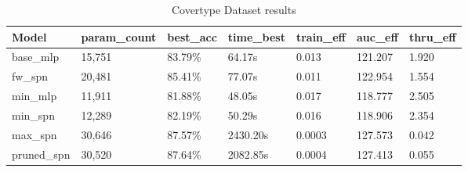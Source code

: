 \begin{table}[h!]
    \centering
    \caption{Covertype Dataset results}
    \begin{tabular}{|l|l|l|l|l|l|l|}
    \hline
    \textbf{Model} & \textbf{param\_count} & \textbf{best\_acc} & \textbf{time\_best} & \textbf{train\_eff} & \textbf{auc\_eff} & \textbf{thru\_eff} \\
    \hline
    base\_mlp & 15,751 & 83.79\% & 64.17s & 0.013 & 121.207 & 1.920 \\
    fw\_spn & 20,481 & 85.41\% & 77.07s & 0.011 & 122.954 & 1.554 \\
    min\_mlp & 11,911 & \cellcolor{red!25}81.88\% & \cellcolor{green!25}48.05s & \cellcolor{green!25}0.017 & \cellcolor{red!25}118.777 & \cellcolor{green!25}2.505 \\
    min\_spn & 12,289 & 82.19\% & 50.29s & 0.016 & 118.906 & 2.354 \\
    max\_spn & 30,646 & 87.57\% & \cellcolor{red!25}2430.20s & \cellcolor{red!25}0.0003 & \cellcolor{green!25}127.573 & \cellcolor{red!25}0.042 \\
    pruned\_spn & 30,520 & \cellcolor{green!25}87.64\% & 2082.85s & 0.0004 & 127.413 & 0.055 \\
    \hline
    \end{tabular}
    \label{tab:covertypeResults}
\end{table}

